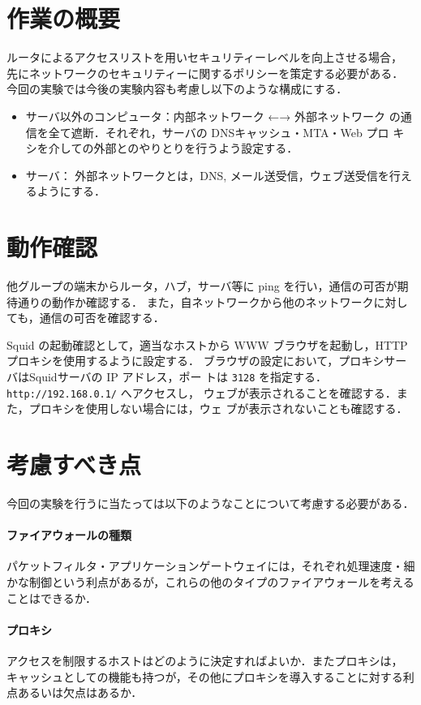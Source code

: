 \section{作業の概要}
ルータによるアクセスリストを用いセキュリティーレベルを向上させる場合，
先にネットワークのセキュリティーに関するポリシーを策定する必要がある．
今回の実験では今後の実験内容も考慮し以下のような構成にする．

\begin{itemize}
 \item サーバ以外のコンピュータ：内部ネットワーク ←→ 外部ネットワーク
       の通信を全て遮断．それぞれ，サーバの DNSキャッシュ・MTA・Web プロ
       キシを介しての外部とのやりとりを行うよう設定する．
 \item サーバ： 外部ネットワークとは，DNS, メール送受信，ウェブ送受信を行えるようにする．
\end{itemize}

\section{動作確認}
他グループの端末からルータ，ハブ，サーバ等に ping を行い，通信の可否が期待通りの動作か確認する．
また，自ネットワークから他のネットワークに対しても，通信の可否を確認する．

Squid の起動確認として，適当なホストから WWW ブラウザを起動し，HTTP プロキシを使用するように設定する．
ブラウザの設定において，プロキシサーバはSquidサーバの IP アドレス，ポー
トは \texttt{3128} を指定する．\texttt{http://192.168.0.1/} へアクセスし，
ウェブが表示されることを確認する．また，プロキシを使用しない場合には，ウェ
ブが表示されないことも確認する．

\section{考慮すべき点}
今回の実験を行うに当たっては以下のようなことについて考慮する必要がある．

\paragraph{ファイアウォールの種類}
パケットフィルタ・アプリケーションゲートウェイには，それぞれ処理速度・細
かな制御という利点があるが，これらの他のタイプのファイアウォールを考える
ことはできるか．

\paragraph{プロキシ}
アクセスを制限するホストはどのように決定すればよいか．またプロキシは，
キャッシュとしての機能も持つが，その他にプロキシを導入することに対する利
点あるいは欠点はあるか．
